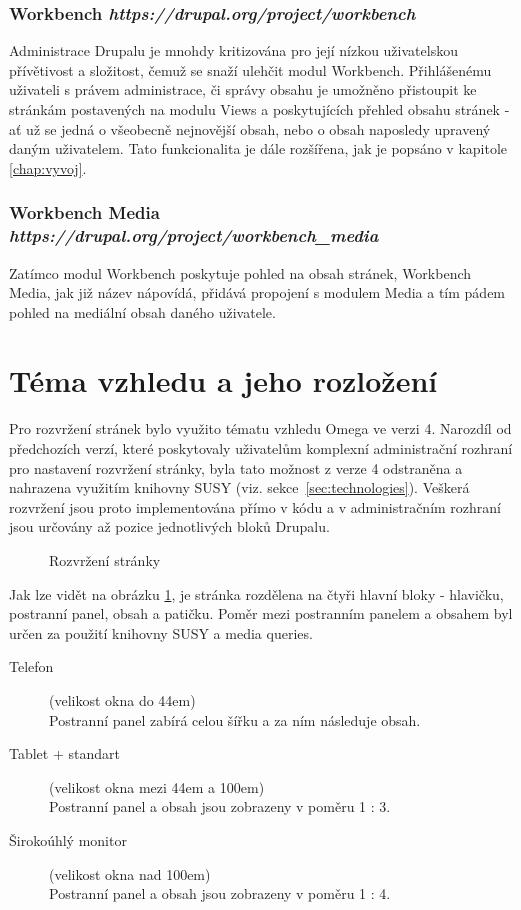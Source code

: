 \subsubsection*{Workbench \hfill \emph{https://drupal.org/project/workbench}}
\label{subsec:workbench}
Administrace Drupalu je mnohdy kritizována pro její nízkou uživatelskou přívětivost a složitost, čemuž se snaží ulehčit modul Workbench. Přihlášenému uživateli s právem administrace, či správy obsahu je umožněno přistoupit ke stránkám postavených na modulu Views a poskytujících přehled obsahu stránek - ať už se jedná o všeobecně nejnovější obsah, nebo o obsah naposledy upravený daným uživatelem. Tato funkcionalita je dále rozšířena, jak je popsáno v kapitole \ref{chap:vyvoj}.

\subsubsection*{Workbench Media \hfill \emph{https://drupal.org/project/workbench\_media}}
Zatímco modul Workbench poskytuje pohled na obsah stránek, Workbench Media, jak již název nápovídá, přidává propojení s modulem Media a tím pádem pohled na mediální obsah daného uživatele. 

\section{Téma vzhledu a jeho rozložení}
Pro rozvržení stránek bylo využito tématu vzhledu Omega ve verzi 4. Narozdíl od předchozích verzí, které poskytovaly uživatelům komplexní administrační rozhraní pro nastavení rozvržení stránky, byla tato možnost z verze 4 odstraněna a nahrazena využitím knihovny SUSY (viz. sekce~\ref{sec:technologies}). Veškerá rozvržení jsou proto implementována přímo v kódu a v administračním rozhraní jsou určovány až pozice jednotlivých bloků Drupalu. 

\begin{figure}[htp] 
  \caption{Rozvržení stránky}
  \label{fig:rozvrzeni-stranky}
\end{figure}  

Jak lze vidět na obrázku \ref{fig:rozvrzeni-stranky}, je stránka rozdělena na čtyři hlavní bloky - hlavičku, postranní panel, obsah a patičku. Poměr mezi postranním panelem a obsahem byl určen za použití knihovny SUSY a media queries. 

\begin{description}
  \item[Telefon] (velikost okna do 44em) \hfill \\
  Postranní panel zabírá celou šířku a za ním následuje obsah.
  \item[Tablet + standart] (velikost okna mezi 44em a 100em) \hfill \\
  Postranní panel a obsah jsou zobrazeny v poměru 1 : 3.
  \item[Širokoúhlý monitor] (velikost okna nad 100em) \hfill \\
  Postranní panel a obsah jsou zobrazeny v poměru 1 : 4.  
\end{description}

